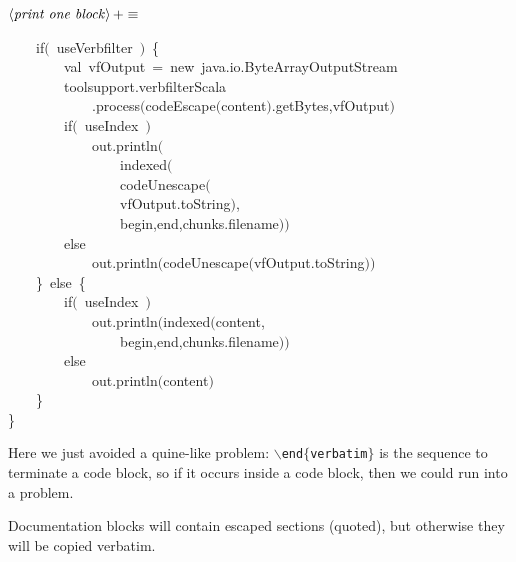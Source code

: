\documentclass[a4paper,12pt]{article}
\begin{document}
$\left<\mbox{\emph{print one block}}\right>+\equiv$
\begin{program}~~~~{\vem if}$($~useVerbfilter~$)$~{\small\{}
\\~~~~~~~~{\vem val}~vfOutput~=~{\vem new}~java.io.ByteArrayOutputStream
\\~~~~~~~~toolsupport.verbfilterScala
\\~~~~~~~~~~~~.process$($codeEscape$($content$)$.getBytes,vfOutput$)$
\\~~~~~~~~{\vem if}$($~useIndex~$)$
\\~~~~~~~~~~~~out.println$($
\\~~~~~~~~~~~~~~~~indexed$($
\\~~~~~~~~~~~~~~~~codeUnescape$($
\\~~~~~~~~~~~~~~~~vfOutput.toString$)$,
\\~~~~~~~~~~~~~~~~begin,end,chunks.filename$)$$)$
\\~~~~~~~~{\vem else}
\\~~~~~~~~~~~~out.println$($codeUnescape$($vfOutput.toString$)$$)$
\\~~~~{\small\}}~{\vem else}~{\small\{}
\\~~~~~~~~{\vem if}$($~useIndex~$)$
\\~~~~~~~~~~~~out.println$($indexed$($content,
\\~~~~~~~~~~~~~~~~begin,end,chunks.filename$)$$)$
\\~~~~~~~~{\vem else}
\\~~~~~~~~~~~~out.println$($content$)$
\\~~~~{\small\}}
\\{\small\}}
\\[0.5em]\end{program}


Here we just avoided a quine-like problem: \texttt{$\backslash$end$\{$verbatim$\}$} is the sequence
to terminate a code block, so if it occurs inside a code block, then we could
run into a problem.

Documentation blocks will contain escaped sections (quoted), but otherwise
they will be copied verbatim.
\end{document}
